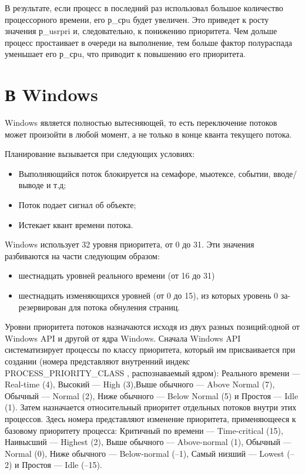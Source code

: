 В результате, если процесс в последний раз использовал большое количество процессорного времени, его р\_срu будет увеличен. Это приведет к росту значения р\_usrpri и, следовательно, к понижению приоритета. Чем дольше процесс простаивает в очереди на выполнение, тем больше фактор полураспада уменьшает его р\_срu, что приводит к повышению его приоритета.

\section{В Windows}
Windows является полностью вытесняющей, то есть переключение
потоков может произойти в любой момент, а не только в конце кванта текущего потока.

Планирование вызывается при следующих условиях:
\begin{itemize}
	\item Выполняющийся поток блокируется на семафоре, мьютексе, событии, вводе/выводе и т.д;
	\item Поток подает сигнал об объекте;
	\item Истекает квант времени потока.
\end{itemize}

Windows использует 32 уровня приоритета, от 0 до 31. Эти значения
разбиваются на части следующим образом:
\begin{itemize}
	\item шестнадцать уровней реального времени (от 16 до 31)
	\item шестнадцать изменяющихся уровней (от 0 до 15), из которых уровень 0 за-
	резервирован для потока обнуления страниц.
\end{itemize}

Уровни приоритета потоков назначаются исходя из двух разных позиций:одной от Windows API и другой от ядра Windows. Сначала Windows API систематизирует процессы по классу приоритета, который им присваивается при создании (номера представляют внутренний индекс PROCESS\_PRIORITY\_CLASS , распознаваемый ядром): Реального времени — Real-time (4), Высокий — High (3),Выше обычного — Above Normal (7), Обычный — Normal (2), Ниже обычного — Below Normal (5) и Простоя — Idle (1). Затем назначается относительный приоритет отдельных потоков внутри этих процессов. Здесь номера представляют изменение приоритета, применяющееся к базовому приоритету процесса: Критичный по времени — Time-critical (15), Наивысший — Highest (2), Выше обычного — Above-normal (1), Обычный — Normal (0), Ниже обычного — Below-normal (–1), Самый низший — Lowest (–2) и Простоя — Idle (–15).

